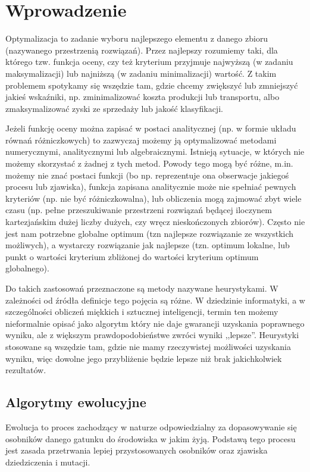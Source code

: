 \documentclass[./FM_mgr.tex]{subfiles}
\begin{document}
\chapter*{Wprowadzenie}

Optymalizacja to zadanie wyboru najlepszego elementu z danego zbioru (nazywanego przestrzenią rozwiązań). 
Przez najlepszy rozumiemy taki, dla którego tzw. funkcja oceny, czy też kryterium przyjmuje najwyższą (w zadaniu maksymalizacji) lub najniższą (w zadaniu minimalizacji) wartość. 
Z takim problemem spotykamy się wszędzie tam, gdzie chcemy zwiększyć lub zmniejszyć jakieś wskaźniki, np. zminimalizować koszta produkcji lub transportu, albo zmaksymalizować zyski ze sprzedaży lub jakość klasyfikacji.

Jeżeli funkcję oceny można zapisać w postaci analitycznej (np. w formie układu równań różniczkowych) to zazwyczaj możemy ją optymalizować metodami numerycznymi, analitycznymi lub algebraicznymi. 
Istnieją sytuacje, w których nie możemy skorzystać z żadnej z tych metod. 
Powody tego mogą być różne, m.in. możemy nie znać postaci funkcji (bo np. reprezentuje ona obserwacje jakiegoś procesu lub zjawiska), funkcja zapisana analitycznie może nie spełniać pewnych kryteriów (np. nie być różniczkowalna), lub obliczenia mogą zajmować zbyt wiele czasu (np. pełne przeszukiwanie przestrzeni rozwiązań będącej iloczynem kartezjańskim dużej liczby dużych, czy wręcz nieskończonych zbiorów). 
Często nie jest nam potrzebne globalne optimum (tzn najlepsze rozwiązanie ze wszystkich możliwych), a wystarczy rozwiązanie jak najlepsze (tzn. optimum lokalne, lub punkt o wartości kryterium zbliżonej do wartości kryterium optimum globalnego).

Do takich zastosowań przeznaczone są metody nazywane heurystykami. 
W zależności od źródła definicje tego pojęcia są różne. 
W dziedzinie informatyki, a w szczególności obliczeń miękkich i sztucznej inteligencji, termin ten możemy nieformalnie opisać jako algorytm który nie daje gwarancji uzyskania poprawnego wyniku, ale z większym prawdopodobieństwe zwróci wyniki ,,lepsze''.
Heurystyki stosowane są wszędzie tam, gdzie nie mamy rzeczywistej możliwości uzyskania wyniku, więc dowolne jego przybliżenie będzie lepsze niż brak jakichkolwiek rezultatów.

\section*{Algorytmy ewolucyjne} \label{section:eaShortDesc}

Ewolucja to proces zachodzący w naturze odpowiedzialny za dopasowywanie się osobników danego gatunku do środowiska w jakim żyją. 
Podstawą tego procesu jest zasada przetrwania lepiej przystosowanych osobników oraz zjawiska dziedziczenia i mutacji.
\end{document}
